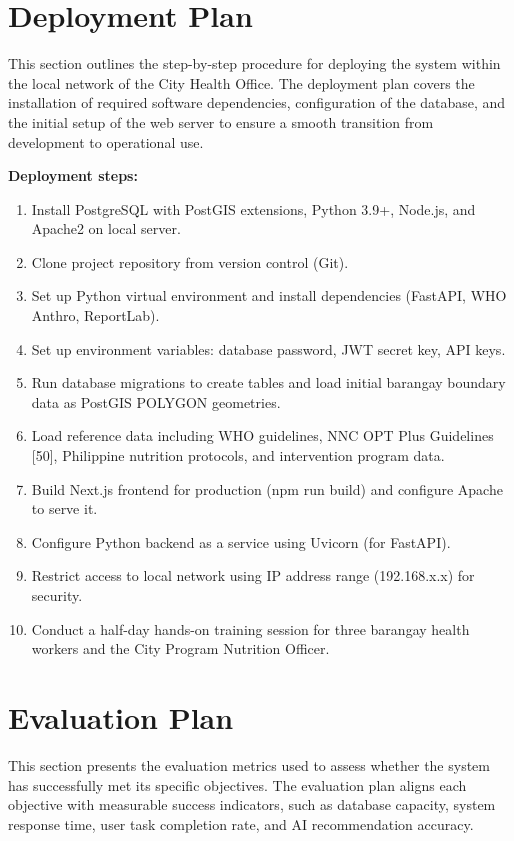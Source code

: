 \documentclass[12pt, a4paper]{report}
\begin{document}
\section{Deployment Plan}
\label{sec:deployment}
This section outlines the step-by-step procedure for deploying the system within the local network of the City Health Office. The deployment plan covers the installation of required software dependencies, configuration of the database, and the initial setup of the web server to ensure a smooth transition from development to operational use.

\noindent \textbf{Deployment steps:}
\begin{enumerate}
    \item Install PostgreSQL with PostGIS extensions, Python 3.9+, Node.js, and Apache2 on local server.
    \item Clone project repository from version control (Git).
    \item Set up Python virtual environment and install dependencies (FastAPI, WHO Anthro, ReportLab).
    \item Set up environment variables: database password, JWT secret key, API keys.
    \item Run database migrations to create tables and load initial barangay boundary data as PostGIS POLYGON geometries.
    \item Load reference data including WHO guidelines, NNC OPT Plus Guidelines [50], Philippine nutrition protocols, and intervention program data.
    \item Build Next.js frontend for production (npm run build) and configure Apache to serve it.
    \item Configure Python backend as a service using Uvicorn (for FastAPI).
    \item Restrict access to local network using IP address range (192.168.x.x) for security.
    \item Conduct a half-day hands-on training session for three barangay health workers and the City Program Nutrition Officer.
\end{enumerate}

\section{Evaluation Plan}
\label{sec:evaluation}
This section presents the evaluation metrics used to assess whether the system has successfully met its specific objectives. The evaluation plan aligns each objective with measurable success indicators, such as database capacity, system response time, user task completion rate, and AI recommendation accuracy.
\end{document}

